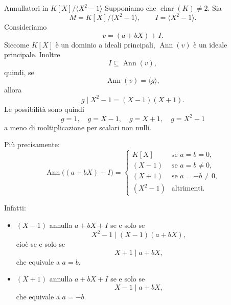 \documentclass[a4paper]{article}
\begin{document}
\begin{radioactive}
\begin{snippetexample}{Annullatori in \(K[X]/\langle X^2-1 \rangle\)}
    Supponiamo che \(\operatorname{char}(K)\neq 2\). Sia
    \[
        M=K[X]/\langle X^2-1 \rangle,
        \qquad
        I=\langle X^2-1 \rangle.
    \]
    Consideriamo
    \[
        v=(a+bX)+I.
    \]
    Siccome \(K[X]\) è un dominio a ideali principali, \(\operatorname{Ann}(v)\) è un ideale principale. Inoltre
    \[
        I\subseteq \operatorname{Ann}(v),
    \]
    quindi, se
    \[
        \operatorname{Ann}(v)=\langle g \rangle,
    \]
    allora
    \[
        g\mid X^2-1=(X-1)(X+1).
    \]
    Le possibilità sono quindi
    \[
        g=1,\quad g=X-1,\quad g=X+1,\quad g=X^2-1
    \]
    a meno di moltiplicazione per scalari non nulli.

    Più precisamente:
    \[
        \operatorname{Ann}\big((a+bX)+I\big)
        =
        \begin{cases}
            K[X] & \text{se } a=b=0,\\
            (X-1) & \text{se } a=b\neq 0,\\
            (X+1) & \text{se } a=-b\neq 0,\\
            (X^2-1) & \text{altrimenti}.
        \end{cases}
    \]

    Infatti:
    \begin{itemize}
        \item \((X-1)\) annulla \(a+bX+I\) se e solo se
        \[
            X^2-1\mid (X-1)(a+bX),
        \]
        cioè se e solo se
        \[
            X+1\mid a+bX,
        \]
        che equivale a \(a=b\).

        \item \((X+1)\) annulla \(a+bX+I\) se e solo se
        \[
            X-1\mid a+bX,
        \]
        che equivale a \(a=-b\).
    \end{itemize}
\end{snippetexample}
\end{radioactive}
\end{document}
